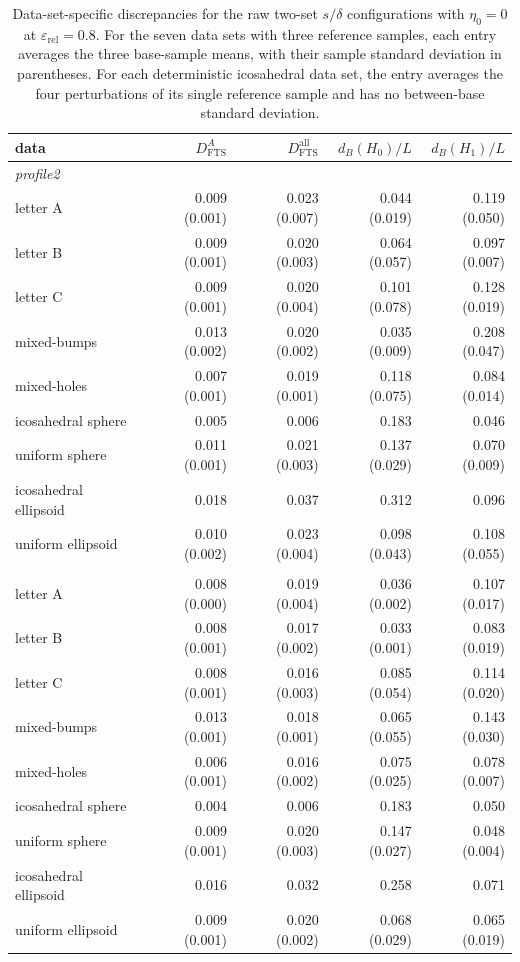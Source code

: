 \documentclass[a4paper,11pt]{article}
\theoremstyle{definition}
\theoremstyle{remark}
\begin{document}
\begin{table}[!ht]
\centering
\scriptsize
\caption{Data-set-specific discrepancies for the raw two-set $s/\delta$ configurations with $\eta_0=0$ at $\varepsilon_{\mathrm{rel}}=0.8$. For the seven data sets with three reference samples, each entry averages the three base-sample means, with their sample standard deviation in parentheses. For each deterministic icosahedral data set, the entry averages the four perturbations of its single reference sample and has no between-base standard deviation.}
\label{tab:stability-by-dataset}
\begin{tabular}{lrrrr}
\toprule
data & $D_{\mathrm{FTS}}^A$ & $D_{\mathrm{FTS}}^{\mathrm{all}}$ & $d_B(H_0)/L$ & $d_B(H_1)/L$ \\
\midrule
\multicolumn{5}{l}{\emph{profile2}}\\
letter A & 0.009 (0.001) & 0.023 (0.007) & 0.044 (0.019) & 0.119 (0.050) \\
letter B & 0.009 (0.001) & 0.020 (0.003) & 0.064 (0.057) & 0.097 (0.007) \\
letter C & 0.009 (0.001) & 0.020 (0.004) & 0.101 (0.078) & 0.128 (0.019) \\
mixed-bumps & 0.013 (0.002) & 0.020 (0.002) & 0.035 (0.009) & 0.208 (0.047) \\
mixed-holes & 0.007 (0.001) & 0.019 (0.001) & 0.118 (0.075) & 0.084 (0.014) \\
icosahedral sphere & 0.005 & 0.006 & 0.183 & 0.046 \\
uniform sphere & 0.011 (0.001) & 0.021 (0.003) & 0.137 (0.029) & 0.070 (0.009) \\
icosahedral ellipsoid & 0.018 & 0.037 & 0.312 & 0.096 \\
uniform ellipsoid & 0.010 (0.002) & 0.023 (0.004) & 0.098 (0.043) & 0.108 (0.055) \\
\addlinespace
\multicolumn{5}{l}{\emph{adaptive2}}\\
letter A & 0.008 (0.000) & 0.019 (0.004) & 0.036 (0.002) & 0.107 (0.017) \\
letter B & 0.008 (0.001) & 0.017 (0.002) & 0.033 (0.001) & 0.083 (0.019) \\
letter C & 0.008 (0.001) & 0.016 (0.003) & 0.085 (0.054) & 0.114 (0.020) \\
mixed-bumps & 0.013 (0.001) & 0.018 (0.001) & 0.065 (0.055) & 0.143 (0.030) \\
mixed-holes & 0.006 (0.001) & 0.016 (0.002) & 0.075 (0.025) & 0.078 (0.007) \\
icosahedral sphere & 0.004 & 0.006 & 0.183 & 0.050 \\
uniform sphere & 0.009 (0.001) & 0.020 (0.003) & 0.147 (0.027) & 0.048 (0.004) \\
icosahedral ellipsoid & 0.016 & 0.032 & 0.258 & 0.071 \\
uniform ellipsoid & 0.009 (0.001) & 0.020 (0.002) & 0.068 (0.029) & 0.065 (0.019) \\
\bottomrule
\end{tabular}
\end{table}
\end{document}
